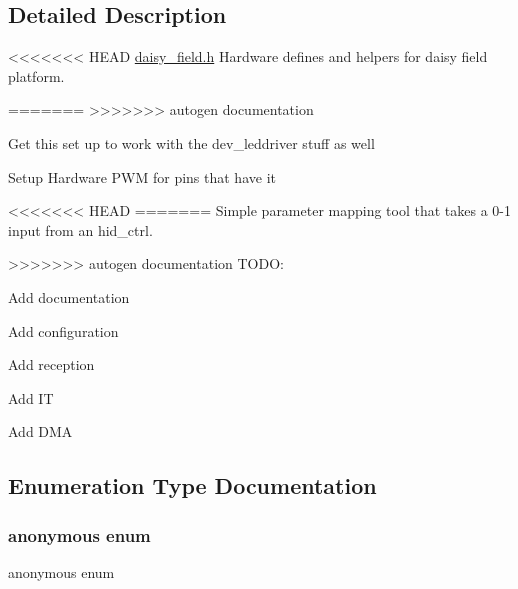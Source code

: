 \subsection{Detailed Description}
<<<<<<< HEAD
\hyperlink{daisy__field_8h_source}{daisy\+\_\+field.\+h} Hardware defines and helpers for daisy field platform.

=======
>>>>>>> autogen documentation

\begin{DoxyItemize}
\item Get this set up to work with the dev\+\_\+leddriver stuff as well
\end{DoxyItemize}

Setup Hardware P\+WM for pins that have it

<<<<<<< HEAD
=======
Simple parameter mapping tool that takes a 0-\/1 input from an hid\+\_\+ctrl.

>>>>>>> autogen documentation
T\+O\+DO\+:
\begin{DoxyItemize}
\item Add documentation
\item Add configuration
\item Add reception
\item Add IT
\item Add D\+MA 
\end{DoxyItemize}

\subsection{Enumeration Type Documentation}
\mbox{\label{namespacedaisy_addc77b0887e2ab2d7341ab97015ce26f}} 
\subsubsection{\texorpdfstring{anonymous enum}{anonymous enum}}
{\footnotesize\ttfamily anonymous enum}

